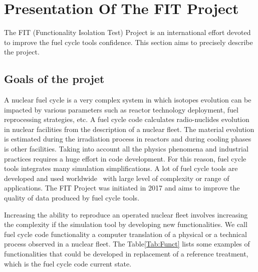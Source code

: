 \section{Presentation Of The FIT Project}

The FIT (Functionality Isolation Test) Project is an international effort
devoted to improve the fuel cycle tools confidence. This section aims to
precisely describe the project.


\subsection{Goals of the projet}

A nuclear fuel cycle is a very complex system in which isotopes evolution can be
impacted by various parameters such as reactor technology deployment, fuel
reprocessing strategies, etc. A fuel cycle code calculates radio-nuclides
evolution in nuclear facilities from the description of a nuclear fleet. The
material evolution is estimated during the irradiation process in reactors and
during cooling phases is other facilities. Taking into account all the physics
phenomena and industrial practices requires a huge effort in code development.
For this reason, fuel cycle tools integrates many simulation simplifications. A
lot of fuel cycle tools are developed and used worldwide~\cite{COSI6_2015,
VanDenDurpel2015, Huff2016} with large level of complexity or range of
applications. The FIT Project was initiated in 2017 and aims to improve the
quality of data produced by fuel cycle tools. 

Increasing the ability to reproduce an operated nuclear fleet involves
increasing the complexity if the simulation tool by developing new
functionalities. We call fuel cycle code functionality a computer translation of
a physical or a technical process observed in a nuclear fleet. The
Table\ref{Tab:Funct} lists some examples of functionalities that could be
developed in replacement of a reference treatment, which is the fuel cycle code
current state.

